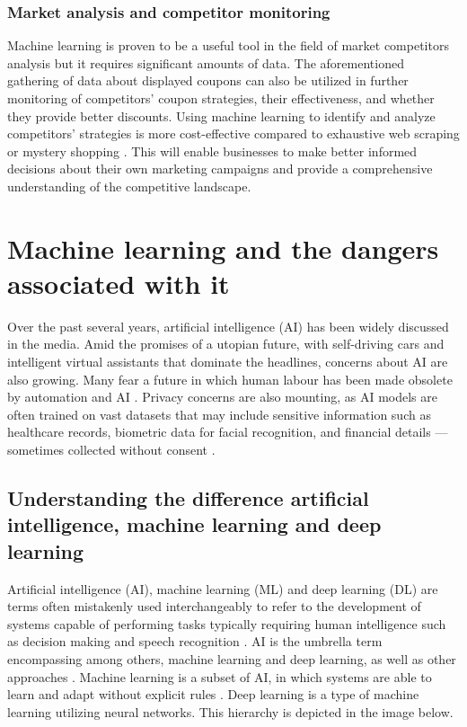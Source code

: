 \documentclass[licencjacka,en]{pracamgr}
\begin{document}
\subsection{Market analysis and competitor monitoring}
Machine learning is proven to be a useful tool in the field of market competitors analysis but it requires significant amounts of data\cite{competitor_tariffs}.
The aforementioned gathering of data about displayed coupons can also be utilized in further monitoring of competitors' coupon strategies, their effectiveness, and whether they provide better discounts. Using machine learning to identify and analyze competitors' strategies is more cost-effective compared to exhaustive web scraping or mystery shopping \cite{competitor_tariffs}. This will enable businesses to make better informed decisions about their own marketing campaigns and provide a comprehensive understanding of the competitive landscape.


\chapter{Machine learning and the dangers associated with it}

Over the past several years, artificial intelligence (AI) has been widely discussed in the media. Amid the promises of a utopian future, with self-driving cars and intelligent virtual assistants that dominate the headlines, concerns about AI are also growing. Many fear a future in which human labour has been made obsolete by automation and AI \cite{francuz_1}. Privacy concerns are also mounting, as AI models are often trained on vast datasets that may include sensitive information such as healthcare records, biometric data for facial recognition, and financial details — sometimes collected without consent \cite{ibm_privacy}.

\section{Understanding the difference artificial intelligence, machine learning and deep learning}
Artificial intelligence (AI), machine learning (ML) and deep learning (DL) are terms often mistakenly used interchangeably to refer to the development of systems capable of performing tasks typically requiring human intelligence such as decision making and speech recognition \cite{ibm_ai}. AI is the umbrella term encompassing among others, machine learning and deep learning, as well as other approaches \cite{francuz_2}. Machine learning is a subset of AI, in which systems are able to learn and adapt without explicit rules \cite{ibm_ai}. Deep learning is a type of machine learning utilizing neural networks. This hierarchy is depicted in the image below.
\end{document}
